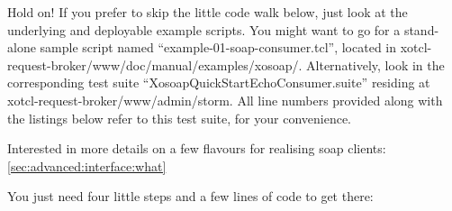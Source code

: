 \begin{hints}
\item Hold on! If you prefer to skip the little code walk below, just
  look at the underlying and deployable example scripts. You might want
  to go for a stand-alone sample script named
  ``example-01-soap-consumer.tcl'', located in
  xotcl-request-broker/www/doc/manual/examples/xosoap/. Alternatively,
  look in the corresponding test suite
  ``XosoapQuickStartEchoConsumer.suite'' residing at
  xotcl-request-broker/www/admin/storm. All line numbers provided
  along with the listings below refer to this test suite, for your convenience.
\item Interested in more details on a few flavours for realising soap
  clients: \ref{sec:advanced:interface:what}
\end{hints}
You just need four little steps and a few lines of code to get there:
